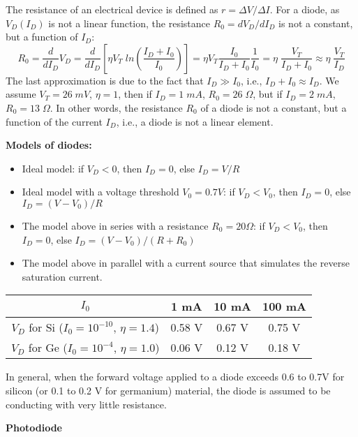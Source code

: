 
The resistance of an electrical device is defined as $r=\Delta V/\Delta I$.
For a diode, as $V_D(I_D)$ is not a linear function, the resistance 
$R_0=dV_D/dI_D$ is not a constant, but a function of $I_D$:
\[
 R_0=\frac{d}{dI_D}V_D=\frac{d}{dI_D} [\eta V_T\;ln (\frac{I_D+I_0}{I_0})]
=\eta V_T \frac{I_0}{I_D+I_0}\frac{1}{I_0}=\eta \; \frac{V_T}{I_D+I_0}
\approx \eta \; \frac{V_T}{I_D}	\]
The last approximation is due to the fact that $I_D \gg I_0$, i.e., 
$I_D+I_0\approx I_D$. We assume $V_T=26\;mV$, $\eta=1$, then if $I_D=1\;mA$, 
$R_0=26\;\Omega$, but if $I_D=2\;mA$, $R_0=13\;\Omega$. In other words, the 
resistance $R_0$ of a diode is not a constant, but a function of the current 
$I_D$, i.e.,  a diode is not a linear element.

{\bf Models of diodes:}


\begin{itemize}
\item Ideal model: if $V_D<0$, then $I_D=0$, else $I_D=V/R$
\item Ideal model with a voltage threshold $V_0=0.7V$:
	if $V_D<V_0$, then $I_D=0$, else $I_D=(V-V_0)/R$
\item The model above in series with a resistance $R_0=20\Omega$:
	if $V_D<V_0$, then $I_D=0$, else $I_D=(V-V_0)/(R+R_0)$
\item The model above in parallel with a current source that simulates
  the reverse saturation current.
\end{itemize}


\begin{tabular}{c||c|c|c}\\ \hline
 $I_0$	& 1 mA & 10 mA & 100 mA	\\ \hline
$V_D$ for Si ($I_0=10^{-10}$, $\eta=1.4$) & 0.58 V & 0.67 V & 0.75 V \\
$V_D$ for Ge ($I_0=10^{-4}$, $\eta=1.0$) & 0.06 V & 0.12 V & 0.18 V \\
\end{tabular}

In general, when the forward voltage applied to a diode exceeds 0.6 to 
0.7V for silicon (or 0.1 to 0.2 V for germanium) material, the diode is 
assumed to be conducting with very little resistance.

{\bf Photodiode}

